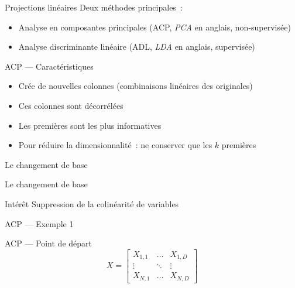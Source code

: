 \begin{frame}{Projections linéaires}
  Deux méthodes principales~:
  \begin{itemize}
    \item Analyse en composantes principales (ACP, \textit{PCA} en anglais, non-supervisée)
    \item Analyse discriminante linéaire (ADL, \textit{LDA} en anglais, supervisée)
  \end{itemize}
\end{frame}

\begin{frame}{ACP --- Caractéristiques}
  \begin{itemize}
    \item Crée de nouvelles colonnes (combinaisons linéaires des originales)
    \item Ces colonnes sont décorrélées
    \item Les premières sont les plus informatives
    \item Pour réduire la dimensionnalité~: ne conserver que les $k$ premières
  \end{itemize}
\end{frame}

\begin{frame}{Le changement de base}
\end{frame}

\begin{frame}{Le changement de base}
\end{frame}

\begin{frame}{Intérêt}
  Suppression de la colinéarité de variables
\end{frame}

\begin{frame}{ACP --- Exemple 1}
\end{frame}


\begin{frame}{ACP --- Point de départ}
  \[
  X = \begin{bmatrix}
    X_{1,1} & \dots  & X_{1,D} \\
    \vdots & \ddots & \vdots \\
    X_{N,1} & \dots  & X_{N,D}
  \end{bmatrix}
  \]
\end{frame}

